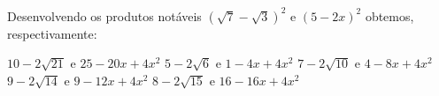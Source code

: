 Desenvolvendo os produtos notáveis $(\sqrt{7}-\sqrt{3})^2$ e $(5-2x)^2$ obtemos, respectivamente:

$10-2\sqrt{21}$ e $25-20x+4x^2$
$5-2\sqrt{6}$ e $1-4x+4x^2$
$7-2\sqrt{10}$ e $4-8x+4x^2$
$9-2\sqrt{14}$ e $9-12x+4x^2$
$8-2\sqrt{15}$ e $16-16x+4x^2$



